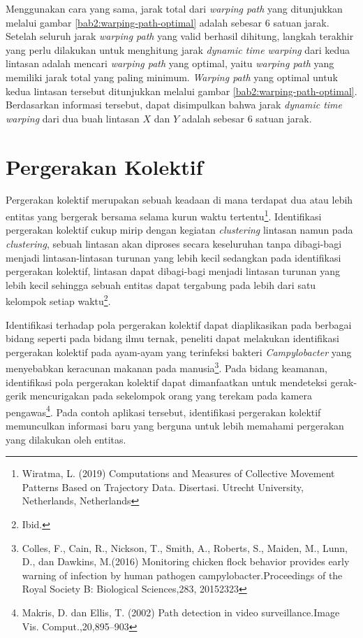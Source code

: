 \documentclass[a4paper,twoside]{article}
\begin{document}
Menggunakan cara yang sama, jarak total dari \textit{warping path} yang ditunjukkan melalui gambar \ref{bab2:warping-path-optimal} adalah sebesar $6$ satuan jarak. Setelah seluruh jarak \textit{warping path} yang valid berhasil dihitung, langkah terakhir yang perlu dilakukan untuk menghitung jarak \textit{dynamic time warping} dari kedua lintasan adalah mencari \textit{warping path} yang optimal, yaitu \textit{warping path} yang memiliki jarak total yang paling minimum. \textit{Warping path} yang optimal untuk kedua lintasan tersebut ditunjukkan melalui gambar \ref{bab2:warping-path-optimal}. Berdasarkan informasi tersebut, dapat disimpulkan bahwa jarak \textit{dynamic time warping} dari dua buah lintasan $X$ dan $Y$ adalah sebesar $6$ satuan jarak.


\section{Pergerakan Kolektif}
\label{sec:collective-movement}

Pergerakan kolektif merupakan sebuah keadaan di mana terdapat dua atau lebih entitas yang bergerak bersama selama kurun waktu tertentu\footnote{Wiratma, L. (2019) Computations and Measures of Collective Movement Patterns Based on Trajectory Data. Disertasi. Utrecht University, Netherlands, Netherlands}. Identifikasi pergerakan kolektif cukup mirip dengan kegiatan \textit{clustering} lintasan namun pada \textit{clustering}, sebuah lintasan akan diproses secara keseluruhan tanpa dibagi-bagi menjadi lintasan-lintasan turunan yang lebih kecil sedangkan pada identifikasi pergerakan kolektif, lintasan dapat dibagi-bagi menjadi lintasan turunan yang lebih kecil sehingga sebuah entitas dapat tergabung pada lebih dari satu kelompok setiap waktu\footnote{Ibid.}.

Identifikasi terhadap pola pergerakan kolektif dapat diaplikasikan pada berbagai bidang seperti pada bidang ilmu ternak, peneliti dapat melakukan identifikasi pergerakan kolektif pada ayam-ayam yang terinfeksi bakteri \textit{Campylobacter} yang menyebabkan keracunan makanan pada manusia\footnote{Colles, F., Cain, R., Nickson, T., Smith, A., Roberts, S., Maiden, M., Lunn, D., dan Dawkins, M.(2016) Monitoring chicken flock behavior provides early warning of infection by human pathogen campylobacter.Proceedings of the Royal Society B: Biological Sciences,283, 20152323}. Pada bidang keamanan, identifikasi pola pergerakan kolektif dapat dimanfaatkan untuk mendeteksi gerak-gerik mencurigakan pada sekelompok orang yang terekam pada kamera pengawas\footnote{Makris, D. dan Ellis, T. (2002) Path detection in video surveillance.Image Vis. Comput.,20,895–903}. Pada contoh aplikasi tersebut, identifikasi pergerakan kolektif memunculkan informasi baru yang berguna untuk lebih memahami pergerakan yang dilakukan oleh entitas.
\end{document}
